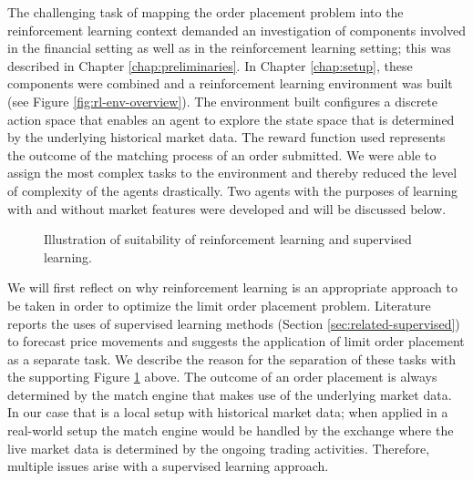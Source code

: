     The challenging task of mapping the order placement problem into the reinforcement learning context demanded an investigation of components involved in the financial setting as well as in the reinforcement learning setting; this was described in Chapter \ref{chap:preliminaries}.
    In Chapter \ref{chap:setup}, these components were combined and a reinforcement learning environment was built (see Figure \ref{fig:rl-env-overview}).
    The environment built configures a discrete action space that enables an agent to explore the state space that is determined by the underlying historical market data.
    The reward function used represents the outcome of the matching process of an order submitted.
    We were able to assign the most complex tasks to the environment and thereby reduced the level of complexity of the agents drastically.
    Two agents with the purposes of learning with and without market features were developed and will be discussed below.
    \begin{figure}[H]
    \centering
    \caption{Illustration of suitability of reinforcement learning and supervised learning.}
    \label{fig:discuss-rl-sv}
    \end{figure}
    We will first reflect on why reinforcement learning is an appropriate approach to be taken in order to optimize the limit order placement problem.
    Literature reports the uses of supervised learning methods (Section \ref{sec:related-supervised}) to forecast price movements and suggests the application of limit order placement as a separate task.
    We describe the reason for the separation of these tasks with the supporting Figure \ref{fig:discuss-rl-sv} above.
    The outcome of an order placement is always determined by the match engine that makes use of the underlying market data.
    In our case that is a local setup with historical market data; when applied in a real-world setup the match engine would be handled by the exchange where the live market data is determined by the ongoing trading activities.
    Therefore, multiple issues arise with a supervised learning approach.
